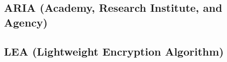 %
%
%
%
%
%
%
%
%
%
%
%
%

\subsection{ARIA (Academy, Research Institute, and Agency)}

\subsection{LEA (Lightweight Encryption Algorithm)}